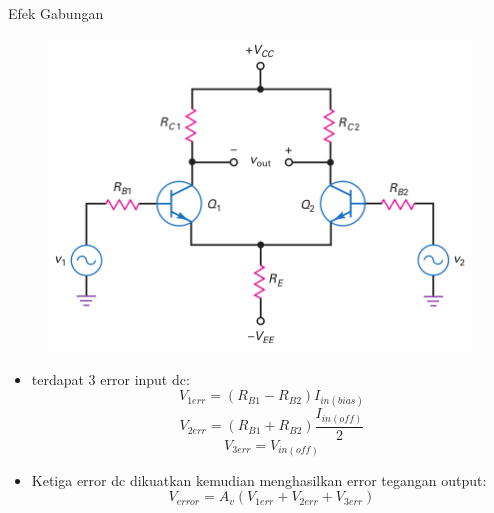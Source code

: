 \documentclass[aspectratio=169]{beamer}
\begin{document}
\begin{frame}{Efek Gabungan}
	\begin{multicols}{2}
		\begin{figure}
			\centering
			\includegraphics[height=0.6\textheight]{gambar/01.diff-amp/01.output_of_diff_amp_includes_desired_signal_and_error_voltage}
		\end{figure}
		\columnbreak
		\begin{itemize}
			\item terdapat 3 error input dc:
			\begin{equation}
				V_{1err} = (R_{B1} - R_{B2}) I_{in(bias)}
			\end{equation}
			\begin{equation}
				V_{2err} = (R_{B1} + R_{B2}) \frac{I_{in(off)}}{2}
			\end{equation}
			\begin{equation}
				V_{3err} = V_{in(off)}
			\end{equation}
			\item Ketiga error dc dikuatkan kemudian menghasilkan error tegangan output:
			\begin{equation}
				V_{error} = A_v (V_{1err} + V_{2err} + V_{3err})
			\end{equation}
		\end{itemize}
	\end{multicols}
\end{frame}
\end{document}
